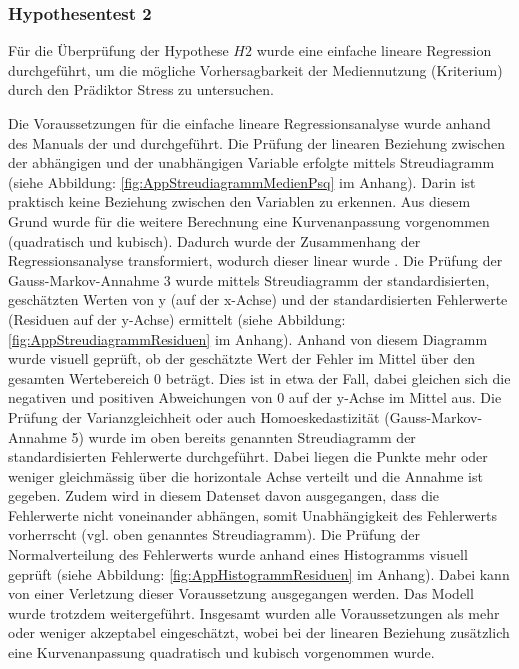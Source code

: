 \subsubsection{Hypothesentest 2}
Für die Überprüfung der Hypothese $H2$ wurde eine einfache lineare Regression durchgeführt, um die mögliche Vorhersagbarkeit der Mediennutzung (Kriterium) durch den Prädiktor Stress zu untersuchen.

Die Voraussetzungen für die einfache lineare Regressionsanalyse wurde anhand des Manuals der  und  durchgeführt. Die Prüfung der linearen Beziehung zwischen der abhängigen und der unabhängigen Variable erfolgte mittels Streudiagramm (siehe Abbildung: \ref{fig:AppStreudiagrammMedienPsq} im Anhang). Darin ist praktisch keine Beziehung zwischen den Variablen zu erkennen. Aus diesem Grund wurde für die weitere Berechnung eine Kurvenanpassung vorgenommen (quadratisch und kubisch). Dadurch wurde der Zusammenhang der Regressionsanalyse transformiert, wodurch dieser linear wurde \cite{UniversitatZurich2018}. Die Prüfung der Gauss-Markov-Annahme 3 \cite{UniversitatZurich2018} wurde mittels Streudiagramm der standardisierten, geschätzten Werten von y (auf der x-Achse) und der standardisierten Fehlerwerte (Residuen auf der y-Achse) ermittelt (siehe  Abbildung: \ref{fig:AppStreudiagrammResiduen} im Anhang). Anhand von diesem Diagramm wurde visuell geprüft, ob  der geschätzte Wert der Fehler im Mittel über den gesamten Wertebereich 0 beträgt. Dies ist in etwa der Fall, dabei gleichen sich die negativen und positiven Abweichungen von 0 auf der y-Achse im Mittel aus. Die Prüfung der Varianzgleichheit oder auch Homoeskedastizität (Gauss-Markov-Annahme 5) wurde im oben bereits genannten Streudiagramm der standardisierten Fehlerwerte durchgeführt. Dabei liegen die Punkte mehr oder weniger gleichmässig über die horizontale Achse verteilt und die Annahme ist gegeben. Zudem wird in diesem Datenset davon ausgegangen, dass die Fehlerwerte nicht voneinander abhängen, somit Unabhängigkeit des Fehlerwerts vorherrscht (vgl. oben genanntes Streudiagramm). Die Prüfung der Normalverteilung des Fehlerwerts wurde anhand eines Histogramms visuell geprüft (siehe Abbildung: \ref{fig:AppHistogrammResiduen} im Anhang). Dabei kann von einer Verletzung dieser Voraussetzung ausgegangen werden. Das Modell wurde trotzdem weitergeführt. Insgesamt wurden alle Voraussetzungen als mehr oder weniger akzeptabel eingeschätzt, wobei bei der linearen Beziehung zusätzlich eine Kurvenanpassung quadratisch und kubisch vorgenommen wurde.

